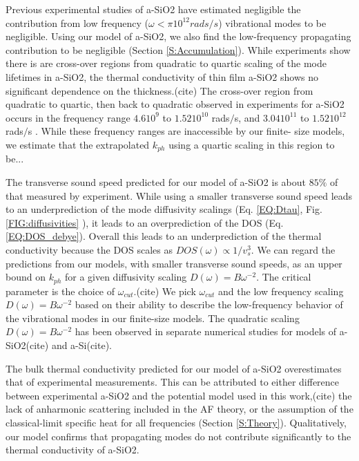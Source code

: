 \documentclass[aps,prb,onecolumn,preprint,superscriptaddress,footinbib,amsmath,amssymb,floatfix]{revtex4}
\begin{document}
{{Previous experimental studies of a-SiO2 have estimated negligible 
the contribution from 
low frequency ($\omega<\pi 10^12 rads/s$)\cite{love_estimate_1990} 
vibrational modes to be negligible. Using our model of a-SiO2, we also 
find the 
low-frequency propagating contribution to be negligible 
(Section \ref{S:Accumulation}). 
While experiments show there is are 
cross-over regions from quadratic to quartic scaling of the mode 
lifetimes in a-SiO2, the thermal conductivity of thin film a-SiO2 shows 
no significant dependence on the thickness.(cite) 
The cross-over 
region from quadratic to quartic, then back to quadratic 
observed in experiments for  
a-SiO2 occurs in the frequency range $4.6 10^9$ to 
$1.52 10^{10}$ rads$/$s,\cite{masciovecchio_evidence_2006} 
and $3.04 10^11$ to 
$1.52 10^{12}$ rads$/$s
\cite{baldi_emergence_2013}. 
While these frequency ranges are inaccessible by our finite-
size models, we estimate that the extrapolated $k_{ph}$ using a quartic 
scaling in this region to be... 

The transverse sound speed predicted for our model of 
a-SiO2 is about $85\%$ of that measured by experiment.\cite{liu_high_2009}  
While using a smaller transverse sound speed 
leads to an underprediction of the 
mode diffusivity scalings (Eq. \eqref{EQ:Dtau},
Fig. \ref{FIG:diffusivities} ), it leads to an 
overprediction of the DOS (Eq. \eqref{EQ:DOS_debye}). 
Overall this leads to an underprediction 
of the thermal conductivity because the DOS scales as 
$DOS(\omega)\propto 1/v^3_{s}$. We can regard the predictions from 
our models, with smaller transverse sound speeds, 
as an upper bound on $k_{ph}$ for a given diffusivity scaling 
$D(\omega) = B\omega^{-2}$. 
The critical parameter is the choice of $\omega_{cut}$.(cite) 
We pick 
$\omega_{cut}$ and the low frequency scaling $D(\omega) = B\omega^{-2}$ 
based on their ability to describe the low-frequency behavior 
of the vibrational modes in our finite-size models. The quadratic scaling 
$D(\omega) = B\omega^{-2}$ has been observed in separate numerical studies 
for models of a-SiO2(cite) and a-Si(cite). 

The bulk thermal conductivity predicted for our model of a-SiO2 overestimates 
that of experimental measurements.\cite{regner_broadband_2013} This can be 
attributed to either difference between experimental a-SiO2 and the 
potential model used in this work,(cite) the lack of anharmonic scattering 
included in the AF theory,\cite{feldman_thermal_1993} or the assumption 
of the classical-limit specific heat for all frequencies 
(Section \ref{S:Theory}). Qualitatively, 
our model confirms that propagating modes do not contribute significantly 
to the thermal conductivity of a-SiO2.
 
}}
\end{document}
